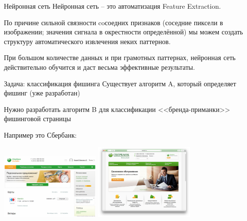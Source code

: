 \begin{frame}{Нейронная сеть}
	Нейронная сеть -- это автоматизация Feature Extraction.
	
	По причине сильной связности coсоедних признаков
	(соседние пиксели в изображении; значения сигнала в окрестности определённой)
	мы можем создать структуру автоматического извлечения неких паттернов.
	
	При большом количестве данных и при грамотных паттернах, нейронная сеть
	действительно обучится и даст весьма эффективные результаты.
	
\end{frame}

\begin{frame}{Задача: классификация фишинга}
	\small
	Существует алгоритм A, который определяет фишинг (уже разработан)
	
	Нужно разработать алгоритм B для классификации <<бренда-приманки>> фишинговой страницы
	
	Например это Сбербанк:
	
	\includegraphics[width=5cm]{../pic/sber1.png}
	\includegraphics[width=5cm]{../pic/sber2.png}
	
\end{frame}

